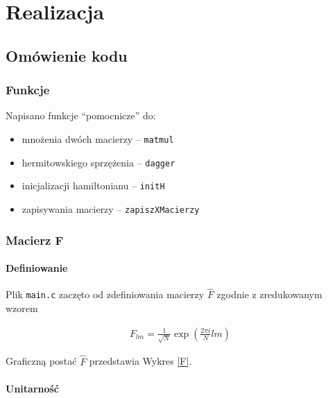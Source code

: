 \documentclass[final,a4paper,twocolumn,12pt]{article}
\title{\Huge{\textgoth{Sprawozdanie - Projekt 8}}}
\author{\Huge{\textfrak{Maciej Flaga}}}
\date{\builddate}
\begin{document}
\maketitle

\section{Realizacja}

\subsection{Omówienie kodu}

\subsubsection{Funkcje}

Napisano funkcje ``pomocnicze'' do:

\begin{itemize}
    \item mnożenia dwóch macierzy -- \texttt{matmul}
    \item hermitowskiego sprzężenia -- \texttt{dagger}
    \item inicjalizacji hamiltonianu -- \texttt{initH}
    \item zapisywania macierzy -- \texttt{zapiszXMacierzy}
\end{itemize}

\subsubsection{Macierz F}

\paragraph{Definiowanie}

Plik \texttt{main.c} zaczęto od zdefiniowania macierzy $\hat{F}$ zgodnie z zredukowanym wzorem

\begin{align*}
    F_{lm} = \frac{1}{\sqrt{N}}\exp{\left(\frac{2\pi i }{N}lm\right)}
\end{align*}

Graficzną postać $\hat{F}$ przedstawia Wykres \vref{F}.

\paragraph{Unitarność}
\end{document}
